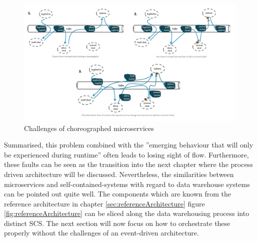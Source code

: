 \begin{figure}[!htb]
    \centering
    \includegraphics[scale=0.33]{pictures/FlowOfEvents.png}
    \caption{Challenges of choreographed microservices \cite{eventDrivenMicroservices}}
    \label{fig:chalengesChoreographedMicroservices}
\end{figure}

Summarised, this problem combined with the ''emerging behaviour that will only be experienced during runtime'' \cite{eventDrivenMicroservices} often leads to losing sight of flow.\newline
Furthermore, these faults can be seen as the transition into the next chapter where the process driven architecture will be discussed. Nevertheless, the similarities between microservices and self-contained-systems with regard to data warehouse systems can be pointed out quite well. The components which are known from the reference architecture in chapter \ref{sec:referenceArchitecture} figure \ref{fig:referenceArchitecture} can be sliced along the data warehousing process into distinct SCS.\newline
The next section will now focus on how to orchestrate these properly without the challenges of an event-driven architecture. 